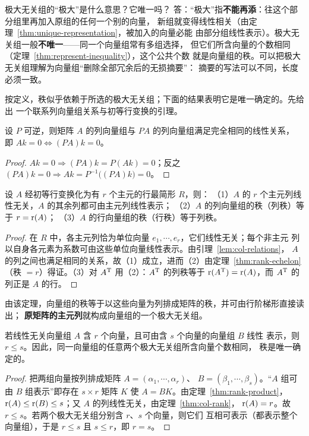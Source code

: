 \begin{qa}{极大无关组的“极大”是什么意思？它唯一吗？}
答：“极大”指\textbf{不能再添}：往这个部分组里再加入原组的任何一个别的向量，
新组就变得线性相关（由定理~\ref{thm:unique-representation}，被加入的向量必能
由部分组线性表示）。极大无关组一般\textbf{不唯一}——同一个向量组常有多组选择，
但它们所含向量的个数相同（定理~\ref{thm:represent-inequality}），这个公共个数
就是向量组的秩。可以把极大无关组理解为向量组“删除全部冗余后的无损摘要”：
摘要的写法可以不同，长度必须一致。
\end{qa}

按定义，秩似乎依赖于所选的极大无关组；下面的结果表明它是唯一确定的。先给出
一个联系列向量组关系与初等行变换的引理。

\begin{lemma}\label{lem:col-relations}
设 $P$ 可逆，则矩阵 $A$ 的列向量组与 $PA$ 的列向量组满足完全相同的线性关系，
即 $Ak=0\iff(PA)k=0$。
\end{lemma}
\begin{proof}
$Ak=0\Rightarrow(PA)k=P(Ak)=0$；反之 $(PA)k=0\Rightarrow
Ak=P^{-1}\big((PA)k\big)=0$。
\end{proof}

\begin{theorem}\label{thm:col-rank}
设 $A$ 经初等行变换化为有 $r$ 个主元的行最简形 $R$，则：
（1）$A$ 的 $r$ 个主元列线性无关，$A$ 的其余列都可由主元列线性表示；
（2）$A$ 的列向量组的秩（列秩）等于 $r=\operatorname{r}(A)$；
（3）$A$ 的行向量组的秩（行秩）等于列秩。
\end{theorem}
\begin{proof}
在 $R$ 中，各主元列恰为单位向量 $e_1,\cdots,e_r$，它们线性无关；每个非主元
列以自身各元素为系数可由这些单位向量线性表示。由引理~\ref{lem:col-relations}，
$A$ 的列之间也满足相同的关系，故（1）成立，进而（2）由定理~\ref{thm:rank-echelon}
（秩 $=r$）得证。（3）对 $A^{\mathrm{T}}$ 用（2）：$A^{\mathrm{T}}$ 的列秩等于
$\operatorname{r}(A^{\mathrm{T}})=\operatorname{r}(A)$，而 $A^{\mathrm{T}}$ 的列正是 $A$ 的行。
\end{proof}

由该定理，向量组的秩等于以这些向量为列排成矩阵的秩，并可由行阶梯形直接读出；
\textbf{原矩阵的主元列}就构成向量组的一个极大无关组。

\begin{theorem}\label{thm:represent-inequality}
若线性无关向量组 $A$ 含 $r$ 个向量，且可由含 $s$ 个向量的向量组 $B$ 线性
表示，则 $r\le s$。因此，同一向量组的任意两个极大无关组所含向量个数相同，
秩是唯一确定的。
\end{theorem}
\begin{proof}
把两组向量按列排成矩阵 $A=(\alpha_1,\cdots,\alpha_r)$、
$B=(\beta_1,\cdots,\beta_s)$。“$A$ 组可由 $B$ 组表示”即存在 $s\times r$
矩阵 $K$ 使 $A=BK$。由定理~\ref{thm:rank-product}，
$\operatorname{r}(A)\le\operatorname{r}(B)\le s$；又 $A$ 的列线性无关，由定理~\ref{thm:col-rank}，
$\operatorname{r}(A)=r$。故 $r\le s$。若两个极大无关组分别含 $r$、$s$ 个向量，则它们
互相可表示（都表示整个向量组），于是 $r\le s$ 且 $s\le r$，即 $r=s$。
\end{proof}

